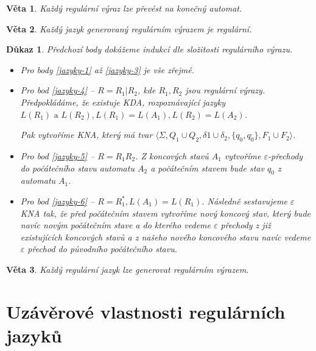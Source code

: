 \documentclass[10pt, a4paper, titlepage]{article}
\theoremstyle{note}
\newtheorem{veta}{\textbf{Věta}}
\newtheorem{dukaz}{\textbf{Důkaz}}
\begin{document}
\begin{veta}
Každý regulární výraz lze převést na konečný automat.
\end{veta}

\begin{veta}
Každý jazyk generovaný regulárním výrazem je regulární.
\end{veta}

\begin{dukaz}
Předchozí body dokážeme indukcí dle složitosti regulárního výrazu.

\begin{itemize}
\item
Pro body \ref{jazyky-1} až \ref{jazyky-3} je vše zřejmé.

\item
Pro bod \ref{jazyky-4} -- $R=R_{1}|R_{2}$, kde $R_{1}, R_{2}$ jsou regulární výrazy. Předpokládáme, že existuje KDA, rozpoznávající
jazyky $L(R_{1}) \text{ a } L(R_{2}), L(R_{1}) = L(A_{1}), L(R_{2}) = L(A_{2})$.

Pak vytvoříme KNA, který má tvar $\langle \Sigma, Q_{1} \cup Q_{2}, \delta{1} \cup \delta_{2}, \lbrace q_{0}, q_{0}^{,} \rbrace, F_{1} \cup F_{2} \rangle$.

\item
Pro bod \ref{jazyky-5}  -- $R=R_{1}R_{2}$. Z koncových stavů $A_{1}$ vytvoříme $\varepsilon$-přechody do počátečního stavu automatu $A_{2}$ a počátečním stavem
bude stav $q_{0}$ z automatu $A_{1}$.

\item
Pro bod \ref{jazyky-6} -- $R=R_{1}^{*}, L(A_{1})=L(R_{1})$. Následně sestavujeme $\varepsilon$ KNA tak, že před počátečním stavem vytvoříme
nový koncový stav, který bude navíc novým počátečním stave a do kterého vedeme $\varepsilon$ přechody z již existujících koncových stavů a z našeho nového koncového stavu navíc vedeme
$\varepsilon$ přechod do původního počátečního stavu.
\end{itemize}
\end{dukaz}

\begin{veta}
Každý regulární jazyk lze generovat regulárním výrazem.
\end{veta}

\section{Uzávěrové vlastnosti regulárních jazyků}
\end{document}
